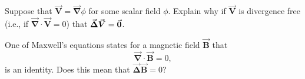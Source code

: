 \documentclass[12pt]{article} %
\newcommand{\grad}{\boldsymbol{\vec{\nabla}}}
\newcommand{\vecfieldV}{\boldsymbol{\vec{V}}}
\newcommand{\veclaplace}{\boldsymbol{\vec{\Delta}}}
\newcommand{\vecfieldB}{\boldsymbol{\vec{B}}}
\begin{document}
\begin{problem}
    Suppose that $\vecfieldV = \grad \phi$ for some scalar field $\phi$.  Explain why if $\vecfieldV$ is divergence free (i.e., if $\grad \cdot \vecfieldV=0$) that $\veclaplace \vecfieldV = \zerovec$.
\end{problem}

\begin{problem}
    One of Maxwell's equations states for a magnetic field $\vecfieldB$ that
    \[
    \grad \cdot \vecfieldB = 0,
    \]
    is an identity.  Does this mean that $\veclaplace \vecfieldB = 0$? 
\end{problem}
\end{document}

